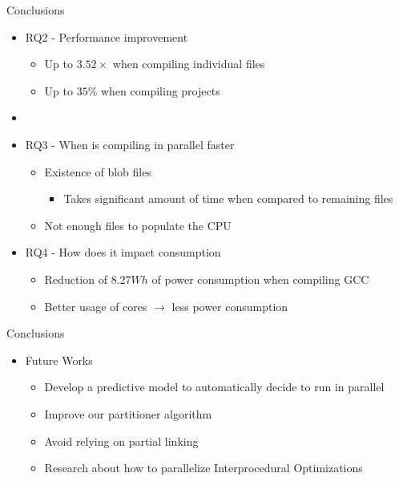 \begin{frame}{Conclusions}
\begin{itemize}
    \item RQ2 - Performance improvement
    \begin{itemize}
        \item Up to $3.52\times$ when compiling individual files
        \item Up to $35\%$ when compiling projects
    \end{itemize}
    \item[]
    \item RQ3 - When is compiling in parallel faster
    \begin{itemize}
        \item Existence of blob files
        \begin{itemize}
            \item Takes significant amount of time when compared to remaining files
        \end{itemize}
        \item Not enough files to populate the CPU
    \end{itemize}
    \item RQ4 - How does it impact consumption
    \begin{itemize}
        \item Reduction of $8.27Wh$ of power consumption when compiling GCC
        \item Better usage of cores $\rightarrow$ less power consumption
    \end{itemize}
\end{itemize}
\end{frame}


\begin{frame}{Conclusions}
\begin{itemize}
    \item Future Works
    \begin{itemize}
        \item Develop a predictive model to automatically decide to run in parallel
        \item Improve our partitioner algorithm
        \item Avoid relying on partial linking
        \item Research about how to parallelize Interprocedural Optimizations
    \end{itemize}
\end{itemize}
\end{frame}

